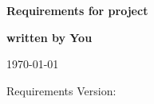 \documentclass{report}
\begin{document}
\thispagestyle{empty}

\mbox{}

\vfill

{\LARGE\textbf{Requirements for project}}

\vfill

{\Large\textbf{written by You}}

\vfill

\today

\vfill

Requirements Version: 

\vfill

\newpage

\tableofcontents

\newpage



% 
\end{document}
